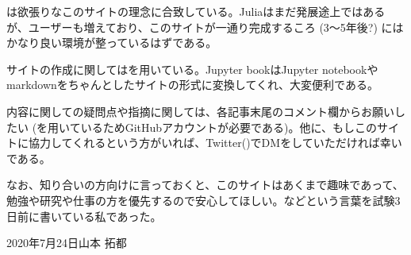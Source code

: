 \documentclass[letterpaper,10pt,english]{sphinxmanual}
\begin{document}
は欲張りなこのサイトの理念に合致している。Juliaはまだ発展途上ではあるが、ユーザーも増えており、このサイトが一通り完成するころ (3～5年後?) にはかなり良い環境が整っているはずである。

サイトの作成に関してはを用いている。Jupyter bookはJupyter notebookやmarkdownをちゃんとしたサイトの形式に変換してくれ、大変便利である。

内容に関しての疑問点や指摘に関しては、各記事末尾のコメント欄からお願いしたい (を用いているためGitHubアカウントが必要である)。他に、もしこのサイトに協力してくれるという方がいれば、Twitter()でDMをしていただければ幸いである。

なお、知り合いの方向けに言っておくと、このサイトはあくまで趣味であって、勉強や研究や仕事の方を優先するので安心してほしい。などという言葉を試験3日前に書いている私であった。

2020年7月24日山本 拓都
\end{document}
